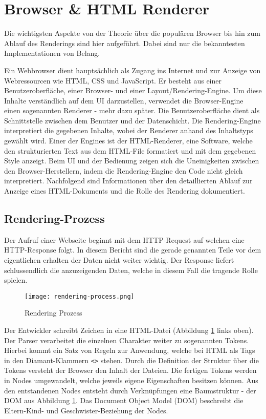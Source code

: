 \section{Browser \& HTML Renderer}
\label{sec:browserRenderer}

Die wichtigsten Aspekte von der Theorie über die populären Browser bis hin zum Ablauf des Renderings sind hier aufgeführt.
Dabei sind nur die bekanntesten Implementationen von Belang.

Ein Webbrowser dient hauptsächlich als Zugang ins Internet und zur Anzeige von Webressourcen wie HTML, CSS und JavaScript.
Er besteht aus einer Benutzeroberfläche, einer Browser- und einer Layout/Rendering-Engine.
Um diese Inhalte verständlich auf dem UI darzustellen, verwendet die Browser-Engine einen sogenannten Renderer - mehr dazu später.
Die Benutzeroberfläche dient als Schnittstelle zwischen dem Benutzer und der Datenschicht. 
Die Rendering-Engine interpretiert die gegebenen Inhalte, wobei der Renderer anhand des Inhaltstyps gewählt wird. 
Einer der Engines ist der HTML-Renderer, eine Software, welche den strukturierten Text aus dem HTML-File formatiert und mit dem gegebenen Style anzeigt.
Beim UI und der Bedienung zeigen sich die Uneinigkeiten zwischen den Browser-Herstellern, indem die Rendering-Engine den Code nicht gleich interpretiert.
Nachfolgend sind Informationen über den detaillierten Ablauf zur Anzeige eines HTML-Dokuments und die Rolle des Rendering dokumentiert.


\subsection{Rendering-Prozess}
\label{sec:structureRendering}

Der Aufruf einer Webseite beginnt mit dem HTTP-Request auf welchen eine HTTP-Response folgt.
In diesem Bericht sind die gerade genannten Teile vor dem eigentlichen erhalten der Daten nicht weiter wichtig.
Der Response liefert schlussendlich die anzuzeigenden Daten, welche in diesem Fall die tragende Rolle spielen.

\begin{figure}[!htb]
    \centering
    \texttt{[image: rendering-process.png]}
    \caption{Rendering Prozess}
    \label{img:RenderingProcess}
\end{figure}

Der Entwickler schreibt Zeichen in eine HTML-Datei (Abbildung \ref{img:RenderingProcess} links oben).
Der Parser verarbeitet die einzelnen Charakter weiter zu sogenannten Tokens.
Hierbei kommt ein Satz von Regeln zur Anwendung, welche bei HTML als Tags in den Diamant-Klammern \texttt{<>} stehen.
Durch die Definition der Struktur über die Tokens versteht der Browser den Inhalt der Dateien.
Die fertigen Tokens werden in Nodes umgewandelt, welche jeweils eigene Eigenschaften besitzen können.
Aus den entstandenen Nodes entsteht durch Verknüpfungen eine Baumstruktur - der DOM aus Abbildung \ref{img:RenderingProcess}.
Das Document Object Model (DOM) beschreibt die Eltern-Kind- und Geschwister-Beziehung der Nodes.

